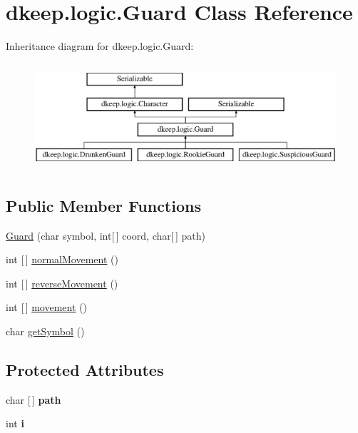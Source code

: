 \hypertarget{classdkeep_1_1logic_1_1_guard}{}\section{dkeep.\+logic.\+Guard Class Reference}
\label{classdkeep_1_1logic_1_1_guard}
Inheritance diagram for dkeep.\+logic.\+Guard\+:\begin{figure}[H]
\begin{center}
\leavevmode
\includegraphics[height=4.000000cm]{classdkeep_1_1logic_1_1_guard}
\end{center}
\end{figure}
\subsection*{Public Member Functions}
\begin{DoxyCompactItemize}
\item 
\hyperlink{classdkeep_1_1logic_1_1_guard_a3e09758314f42000eca6134717672855}{Guard} (char symbol, int\mbox{[}$\,$\mbox{]} coord, char\mbox{[}$\,$\mbox{]} path)
\item 
int \mbox{[}$\,$\mbox{]} \hyperlink{classdkeep_1_1logic_1_1_guard_a2389016085c6d65d4366930fac72dab4}{normal\+Movement} ()
\item 
int \mbox{[}$\,$\mbox{]} \hyperlink{classdkeep_1_1logic_1_1_guard_a8c588aa887fcfe6d3e4a9e13d236c644}{reverse\+Movement} ()
\item 
int \mbox{[}$\,$\mbox{]} \hyperlink{classdkeep_1_1logic_1_1_guard_a4c4590d86f573a575bc3ece3d441f83f}{movement} ()
\item 
char \hyperlink{classdkeep_1_1logic_1_1_guard_a2008fdc91b313fa18059fab7d92ddc61}{get\+Symbol} ()
\end{DoxyCompactItemize}
\subsection*{Protected Attributes}
\begin{DoxyCompactItemize}
\item 
\mbox{\label{classdkeep_1_1logic_1_1_guard_a74ea55aa131d73784e9487ef3aeef5ca}} 
char \mbox{[}$\,$\mbox{]} {\bfseries path}
\item 
\mbox{\label{classdkeep_1_1logic_1_1_guard_a0e0434321ead6cd193358d9069177ba3}} 
int {\bfseries i}
\end{DoxyCompactItemize}


